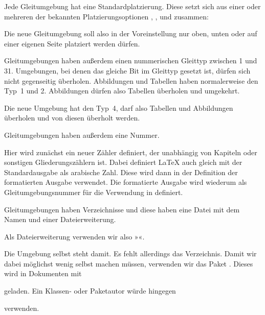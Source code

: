 Jede Gleitumgebung hat eine Standardplatzierung. Diese
setzt sich aus einer oder mehreren der bekannten Platzierungsoptionen
, ,  und  zusammen:
\begin{lstcode}
  \newcommand*{\fps@remarkbox}{tbp}
\end{lstcode}
Die neue Gleitumgebung soll also in der Voreinstellung nur oben, unten oder
auf einer eigenen Seite platziert werden dürfen.

Gleitumgebungen haben außerdem einen nummerischen Gleittyp
zwischen 1 und 31. Umgebungen, bei denen das gleiche Bit
im Gleittyp gesetzt ist, dürfen sich nicht gegenseitig überholen. Abbildungen
und Tabellen haben normalerweise den Typ~1 und 2. Abbildungen dürfen also
Tabellen überholen und umgekehrt.
\begin{lstcode}
  \newcommand*{\ftype@remarkbox}{4}
\end{lstcode}
Die neue Umgebung hat den Typ~4, darf also Tabellen und Abbildungen überholen
und von diesen überholt werden.

Gleitumgebungen haben außerdem eine Nummer.
\begin{lstcode}
  \newcommand*{\remarkboxformat}{%
    Merksatz~\theremarkbox\csname autodot\endcsname
  }
  \newcommand*{\fnum@remarkbox}{\remarkboxformat}
\end{lstcode}
Hier wird zunächst ein neuer Zähler definiert, der unabhängig von Kapiteln
oder sonstigen Gliederungszählern ist. Dabei definiert \LaTeX{} auch gleich
 mit der Standardausgabe als arabische Zahl. Diese wird
dann in der Definition der formatierten Ausgabe verwendet. Die formatierte
Ausgabe wird wiederum als Gleitumgebungsnummer für die Verwendung in
 definiert.

Gleitumgebungen haben Verzeichnisse und diese haben
eine Datei mit dem Namen  und einer Dateierweiterung.
\begin{lstcode}
  \newcommand*{\ext@remarkbox}{lor}
\end{lstcode}
Als Dateierweiterung verwenden wir also »«.

Die Umgebung selbst steht damit. Es fehlt
allerdings das Verzeichnis. Damit wir dabei möglichst wenig selbst machen
müssen, verwenden wir das Paket . Dieses wird in Dokumenten
mit
\begin{lstcode}
  \usepackage{tocbasic}
\end{lstcode}
geladen. Ein Klassen- oder Paketautor würde hingegen
\begin{lstcode}
  \RequirePackage{tocbasic}
\end{lstcode}
verwenden.

